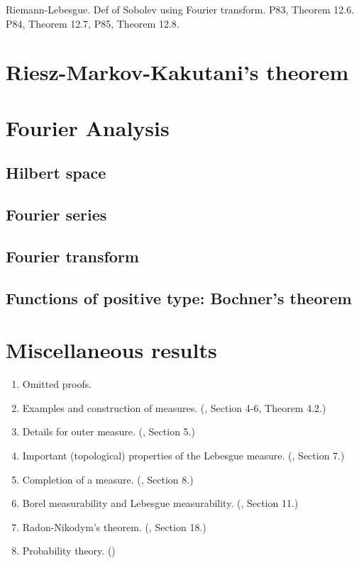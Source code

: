 \documentclass[openany, a4paper, oneside]{jsbook}
\begin{document}
Riemann-Lebesgue.
Def of Sobolev using Fourier transform.
P83, Theorem 12.6.
P84, Theorem 12.7,
P85, Theorem 12.8.
\section{Riesz-Markov-Kakutani's theorem}

\section{Fourier Analysis}

\subsection{Hilbert space}

\subsection{Fourier series}

\subsection{Fourier transform}

\subsection{Functions of positive type: Bochner's theorem}

\section{Miscellaneous results}

\begin{enumerate}
\item Omitted proofs.
\item Examples and construction of measures. (\cite{SeizoIto1}, Section 4-6, Theorem 4.2.)
\item Details for outer measure. (\cite{SeizoIto1}, Section 5.)
\item Important (topological) properties of the Lebesgue measure. (\cite{SeizoIto1}, Section 7.)
\item Completion of a measure. (\cite{SeizoIto1}, Section 8.)
\item Borel measurability and Lebesgue measurability. (\cite{SeizoIto1}, Section 11.)
\item Radon-Nikodym's theorem. (\cite{SeizoIto1}, Section 18.)
\item Probability theory. (\cite{DavidWilliams1, TadahisaFunaki1})
\end{enumerate}
\end{document}
